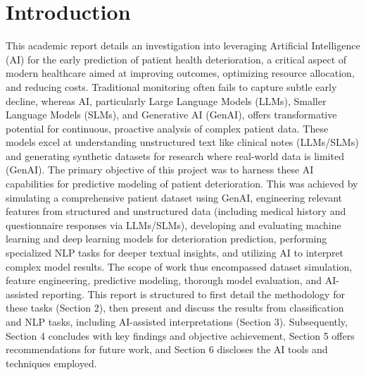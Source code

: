 \section{Introduction}

This academic report details an investigation into leveraging Artificial Intelligence (AI) for the early prediction of patient health deterioration, a critical aspect of modern healthcare aimed at improving outcomes, optimizing resource allocation, and reducing costs. Traditional monitoring often fails to capture subtle early decline, whereas AI, particularly Large Language Models (LLMs), Smaller Language Models (SLMs), and Generative AI (GenAI), offers transformative potential for continuous, proactive analysis of complex patient data. These models excel at understanding unstructured text like clinical notes (LLMs/SLMs) and generating synthetic datasets for research where real-world data is limited (GenAI). The primary objective of this project was to harness these AI capabilities for predictive modeling of patient deterioration. This was achieved by simulating a comprehensive patient dataset using GenAI, engineering relevant features from structured and unstructured data (including medical history and questionnaire responses via LLMs/SLMs), developing and evaluating machine learning and deep learning models for deterioration prediction, performing specialized NLP tasks for deeper textual insights, and utilizing AI to interpret complex model results. The scope of work thus encompassed dataset simulation, feature engineering, predictive modeling, thorough model evaluation, and AI-assisted reporting. This report is structured to first detail the methodology for these tasks (Section 2), then present and discuss the results from classification and NLP tasks, including AI-assisted interpretations (Section 3). Subsequently, Section 4 concludes with key findings and objective achievement, Section 5 offers recommendations for future work, and Section 6 discloses the AI tools and techniques employed.